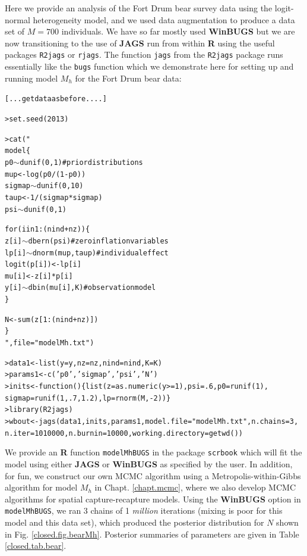 Here we provide an analysis of the Fort Drum bear survey data using
the
 logit-normal heterogeneity model, and we
used data augmentation to produce a data
set of $M=700$ individuals.
We have so far mostly used {\bf WinBUGS} but we are now transitioning
to the use of {\bf JAGS} run from within {\bf R} using the useful
packages \mbox{\tt R2jags} or \mbox{\tt rjags}.  The function
\mbox{\tt jags} from the \mbox{\tt R2jags} package runs essentially
like the \mbox{\tt bugs} function which we demonstrate here for
setting up and running model $M_{h}$ for the Fort Drum bear data:
{\small
\begin{alltt}
[... get data as before ....]

> set.seed(2013)

> cat("
model\{
p0\( \sim \)dunif(0,1)           # prior distributions
mup <- log(p0/(1-p0))
sigmap\( \sim \)dunif(0,10)
taup <- 1/(sigmap*sigmap)
psi\( \sim \)dunif(0,1)

for(i in 1:(nind+nz))\{
  z[i]\( \sim \)dbern(psi)       # zero inflation variables
  lp[i]\( \sim \)dnorm(mup,taup) # individual effect
  logit(p[i]) <- lp[i]
  mu[i] <- z[i]*p[i]
  y[i]\( \sim \)dbin(mu[i],K)    # observation model
 \}

N<-sum(z[1:(nind+nz)])
\}
",file="modelMh.txt")

> data1 <- list(y=y, nz=nz, nind=nind,K=K)
> params1 <- c('p0','sigmap','psi','N')
> inits <- function()\{ list(z=as.numeric(y>=1), psi=.6, p0=runif(1),
          sigmap=runif(1,.7,1.2),lp=rnorm(M,-2)) \}
> library(R2jags)
> wbout <- jags(data1, inits, params1, model.file = "modelMh.txt", n.chains = 3,
            n.iter = 1010000, n.burnin =10000, working.directory = getwd())
\end{alltt}
}

We provide an {\bf R} function \mbox{\tt modelMhBUGS} in the package
\mbox{\tt scrbook} which will fit the model using either {\bf JAGS} or
{\bf WinBUGS} as specified by the user.  In addition, for fun, we
construct our own MCMC algorithm using a Metropolis-within-Gibbs
algorithm for model $M_{h}$ in Chapt. \ref{chapt.mcmc}, where we also
develop MCMC algorithms for spatial capture-recapture models.  Using
the {\bf WinBUGS} option in \mbox{\tt modelMhBUGS}, we ran 3 chains of 1
{\it million} iterations (mixing is poor for this model and this data
set), which produced the posterior distribution for $N$ shown in
Fig. \ref{closed.fig.bearMh}. Posterior summaries of parameters are
given in Table \ref{closed.tab.bear}.


